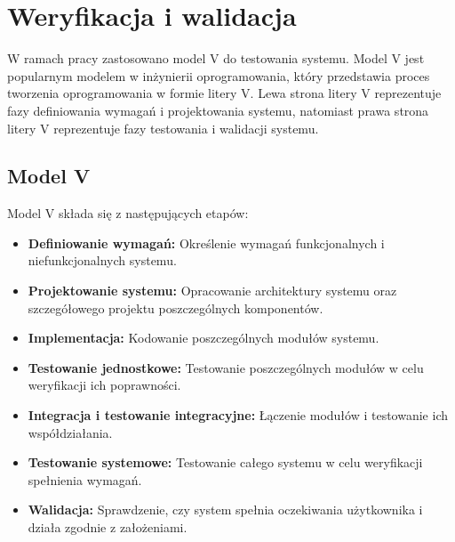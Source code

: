 \documentclass[a4paper,twoside,12pt]{book}
\begin{document}
%      

%      




\chapter{Weryfikacja i walidacja}
W ramach pracy zastosowano model V do testowania systemu. Model V jest popularnym modelem w inżynierii oprogramowania, który przedstawia proces tworzenia oprogramowania w formie litery V. Lewa strona litery V reprezentuje fazy definiowania wymagań i projektowania systemu, natomiast prawa strona litery V reprezentuje fazy testowania i walidacji systemu. 

\section{Model V}
Model V składa się z następujących etapów:
\begin{itemize}
	\item \textbf{Definiowanie wymagań:} Określenie wymagań funkcjonalnych i niefunkcjonalnych systemu.
	\item \textbf{Projektowanie systemu:} Opracowanie architektury systemu oraz szczegółowego projektu poszczególnych komponentów.
	\item \textbf{Implementacja:} Kodowanie poszczególnych modułów systemu.
	\item \textbf{Testowanie jednostkowe:} Testowanie poszczególnych modułów w celu weryfikacji ich poprawności.
	\item \textbf{Integracja i testowanie integracyjne:} Łączenie modułów i testowanie ich współdziałania.
	\item \textbf{Testowanie systemowe:} Testowanie całego systemu w celu weryfikacji spełnienia wymagań.
	\item \textbf{Walidacja:} Sprawdzenie, czy system spełnia oczekiwania użytkownika i działa zgodnie z założeniami.
\end{itemize}
\end{document}
